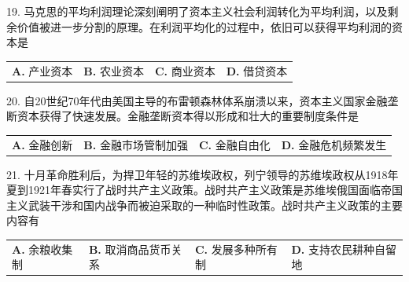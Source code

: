 \documentclass[UTF8,11pt]{ctexart}
\begin{document}
19. 马克思的平均利润理论深刻阐明了资本主义社会利润转化为平均利润，以及剩余价值被进一步分割的原理。在利润平均化的过程中，依旧可以获得平均利润的资本是


\begin{center}\begin{tabular}{>{\raggedright\arraybackslash}p{\dimexpr(\linewidth-8\tabcolsep)/4\relax}>{\raggedright\arraybackslash}p{\dimexpr(\linewidth-8\tabcolsep)/4\relax}>{\raggedright\arraybackslash}p{\dimexpr(\linewidth-8\tabcolsep)/4\relax}>{\raggedright\arraybackslash}p{\dimexpr(\linewidth-8\tabcolsep)/4\relax}}
\textbf{A.} 产业资本 & \textbf{B.} 农业资本 & \textbf{C.} 商业资本 & \textbf{D.} 借贷资本\\[.35em]\end{tabular}\end{center}

20. 自20世纪70年代由美国主导的布雷顿森林体系崩溃以来，资本主义国家金融垄断资本获得了快速发展。金融垄断资本得以形成和壮大的重要制度条件是


\begin{center}\begin{tabular}{>{\raggedright\arraybackslash}p{\dimexpr(\linewidth-8\tabcolsep)/4\relax}>{\raggedright\arraybackslash}p{\dimexpr(\linewidth-8\tabcolsep)/4\relax}>{\raggedright\arraybackslash}p{\dimexpr(\linewidth-8\tabcolsep)/4\relax}>{\raggedright\arraybackslash}p{\dimexpr(\linewidth-8\tabcolsep)/4\relax}}
\textbf{A.} 金融创新 & \textbf{B.} 金融市场管制加强 & \textbf{C.} 金融自由化 & \textbf{D.} 金融危机频繁发生\\[.35em]\end{tabular}\end{center}

21. 十月革命胜利后，为捍卫年轻的苏维埃政权，列宁领导的苏维埃政权从1918年夏到1921年春实行了战时共产主义政策。战时共产主义政策是苏维埃俄国面临帝国主义武装干涉和国内战争而被迫采取的一种临时性政策。战时共产主义政策的主要内容有


\begin{center}\begin{tabular}{>{\raggedright\arraybackslash}p{\dimexpr(\linewidth-8\tabcolsep)/4\relax}>{\raggedright\arraybackslash}p{\dimexpr(\linewidth-8\tabcolsep)/4\relax}>{\raggedright\arraybackslash}p{\dimexpr(\linewidth-8\tabcolsep)/4\relax}>{\raggedright\arraybackslash}p{\dimexpr(\linewidth-8\tabcolsep)/4\relax}}
\textbf{A.} 余粮收集制 & \textbf{B.} 取消商品货币关系 & \textbf{C.} 发展多种所有制 & \textbf{D.} 支持农民耕种自留地\\[.35em]\end{tabular}\end{center}
\end{document}
